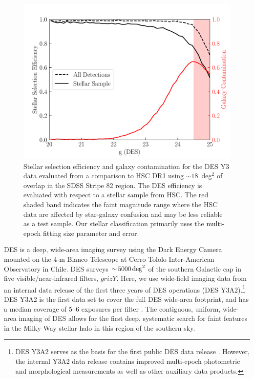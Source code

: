 \documentclass[twocolumn]{aastex61}
\begin{document}
\begin{figure}
\includegraphics[width=\columnwidth]{y3a2_stellar_classification_summary_ext1_g}
\caption{Stellar selection efficiency and galaxy contamination for the DES Y3 data evaluated from a comparison to HSC DR1 using $\sim18$~deg$^2$ of overlap in the SDSS Stripe 82 region.
The DES efficiency is evaluated with respect to a stellar sample from HSC.
The red shaded band indicates the faint magnitude range where the HSC data are affected by star-galaxy confusion and may be less reliable as a test sample.
Our stellar classification primarily uses the \ngmix multi-epoch fitting size parameter and error.
\label{fig:class}
}
\end{figure}


DES is a deep, wide-area imaging survey using the Dark Energy Camera \citep[DECam;][]{Flaugher:2015} mounted on the 4-m Blanco Telescope at Cerro Tololo Inter-American Observatory in Chile. 
DES surveys $ {\sim}\, 5000 \deg^2$ of the southern Galactic cap in five visible/near-infrared filters, $grizY$.
Here, we use wide-field imaging data from an internal data release of the first three years of DES operations (DES Y3A2).\footnote{DES Y3A2 serves as the basis for the first public DES data release \citep[DES DR1;][]{DES:2018}. However, the internal Y3A2 data release contains improved multi-epoch photometric and morphological measurements as well as other auxiliary data products.}
DES Y3A2 is the first data set to cover the full DES wide-area footprint, and has a median coverage of 5--6 exposures per filter \citep{Diehl:2016}. %
The contiguous, uniform, wide-area imaging of DES allows for the first deep, systematic search for faint features in the Milky Way stellar halo in this region of the southern sky.
\end{document}

